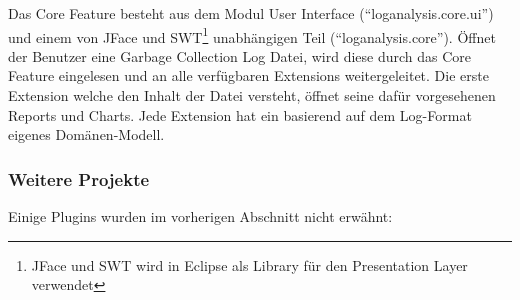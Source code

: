 Das Core Feature besteht aus dem Modul User Interface (``loganalysis.core.ui'') und einem von JFace und SWT\footnote{JFace und SWT wird in Eclipse als Library für den Presentation Layer verwendet} unabhängigen Teil (``loganalysis.core''). Öffnet der Benutzer eine Garbage Collection Log Datei, wird diese durch das Core Feature eingelesen und an alle verfügbaren Extensions weitergeleitet. Die erste Extension welche den Inhalt der Datei versteht, öffnet seine dafür vorgesehenen Reports und Charts. Jede Extension hat ein basierend auf dem Log-Format eigenes Domänen-Modell.

\subsubsection{Weitere Projekte}
Einige Plugins wurden im vorherigen Abschnitt nicht erwähnt:
